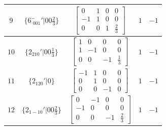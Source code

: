 \documentclass[fleqn,8pt]{jsarticle}
\begin{document}
\begin{longtable}{ccccc}
$ 9 $ & $ \{6^{-}_{\,\,001}{}'|0 0 \frac{2}{3}\} $ & $ \begin{bmatrix} 0 & 1 & 0 & 0 \\ -1 & 1 & 0 & 0 \\ 0 & 0 & 1 & \frac{2}{3} \end{bmatrix} $ & $ 1 $ & $ -1 $ \\ \hline
$ 10 $ & $ \{2{}_{210}{}'|0 0 \frac{1}{3}\} $ & $ \begin{bmatrix} 1 & 0 & 0 & 0 \\ 1 & -1 & 0 & 0 \\ 0 & 0 & -1 & \frac{1}{3} \end{bmatrix} $ & $ 1 $ & $ -1 $ \\ \hline
$ 11 $ & $ \{2{}_{120}{}'|0\} $ & $ \begin{bmatrix} -1 & 1 & 0 & 0 \\ 0 & 1 & 0 & 0 \\ 0 & 0 & -1 & 0 \end{bmatrix} $ & $ 1 $ & $ -1 $ \\ \hline
$ 12 $ & $ \{2{}_{1-10}{}'|0 0 \frac{2}{3}\} $ & $ \begin{bmatrix} 0 & -1 & 0 & 0 \\ -1 & 0 & 0 & 0 \\ 0 & 0 & -1 & \frac{2}{3} \end{bmatrix} $ & $ 1 $ & $ -1 $ \\
\end{longtable}
\end{document}
